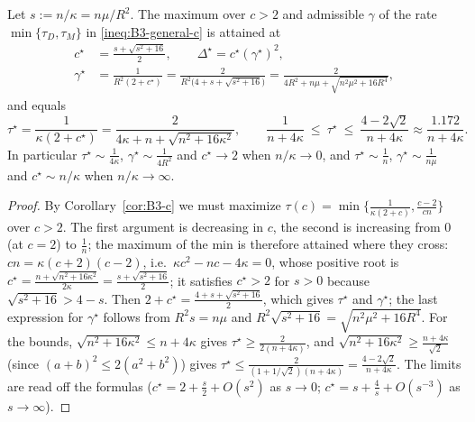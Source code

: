 \begin{proposition}\label{prop:B3-optimum}
Let $s:=n/\kappa=n\mu/R^2$. The maximum over $c>2$ and admissible $\gamma$ of the rate $\min\{\tau_D,\tau_M\}$ in \eqref{ineq:B3-general-c} is attained at
\begin{align*}
c^\star&=\frac{s+\sqrt{s^2+16}}{2},\qquad \Delta^\star=c^\star(\gamma^\star)^2,\\
\gamma^\star&=\frac{1}{R^2(2+c^\star)}=\frac{2}{R^2\big(4+s+\sqrt{s^2+16}\big)}=\frac{2}{4R^2+n\mu+\sqrt{n^2\mu^2+16R^4}},
\end{align*}
and equals
\[
\tau^\star=\frac{1}{\kappa(2+c^\star)}=\frac{2}{4\kappa+n+\sqrt{n^2+16\kappa^2}},\qquad
\frac{1}{n+4\kappa}\ \le\ \tau^\star\ \le\ \frac{4-2\sqrt2}{n+4\kappa}\approx\frac{1.172}{n+4\kappa}.
\]
In particular $\tau^\star\sim\frac1{4\kappa}$, $\gamma^\star\sim\frac1{4R^2}$ and $c^\star\to2$ when $n/\kappa\to0$, and $\tau^\star\sim\frac1n$, $\gamma^\star\sim\frac{1}{n\mu}$ and $c^\star\sim n/\kappa$ when $n/\kappa\to\infty$.
\end{proposition}
\begin{proof}
By Corollary~\ref{cor:B3-c} we must maximize $\tau(c)=\min\{\frac1{\kappa(2+c)},\frac{c-2}{cn}\}$ over $c>2$. The first argument is decreasing in $c$, the second is increasing from $0$ (at $c=2$) to $\frac1n$; the maximum of the min is therefore attained where they cross: $cn=\kappa(c+2)(c-2)$, i.e.\ $\kappa c^2-nc-4\kappa=0$, whose positive root is $c^\star=\frac{n+\sqrt{n^2+16\kappa^2}}{2\kappa}=\frac{s+\sqrt{s^2+16}}2$; it satisfies $c^\star>2$ for $s>0$ because $\sqrt{s^2+16}>4-s$. Then $2+c^\star=\frac{4+s+\sqrt{s^2+16}}{2}$, which gives $\tau^\star$ and $\gamma^\star$; the last expression for $\gamma^\star$ follows from $R^2s=n\mu$ and $R^2\sqrt{s^2+16}=\sqrt{n^2\mu^2+16R^4}$. For the bounds, $\sqrt{n^2+16\kappa^2}\le n+4\kappa$ gives $\tau^\star\ge\frac{2}{2(n+4\kappa)}$, and $\sqrt{n^2+16\kappa^2}\ge\frac{n+4\kappa}{\sqrt2}$ (since $(a+b)^2\le2(a^2+b^2)$) gives $\tau^\star\le\frac{2}{(1+1/\sqrt2)(n+4\kappa)}=\frac{4-2\sqrt2}{n+4\kappa}$. The limits are read off the formulas ($c^\star=2+\frac s2+O(s^2)$ as $s\to0$; $c^\star=s+\frac4s+O(s^{-3})$ as $s\to\infty$).
\end{proof}

